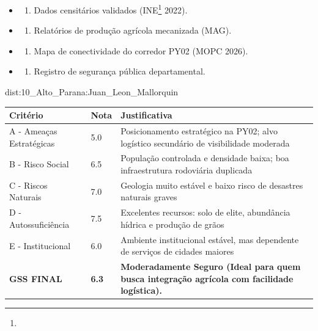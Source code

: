 {\begin{itemize}
\tightlist
\item
  \begin{enumerate}
  \def\labelenumi{\arabic{enumi})}
  \tightlist
  \item
    Dados censitários validados (INE\footnote{\fineINE} 2022).
  \end{enumerate}
\item
  \begin{enumerate}
  \def\labelenumi{\arabic{enumi})}
  \setcounter{enumi}{1}
  \tightlist
  \item
    Relatórios de produção agrícola mecanizada (MAG).
  \end{enumerate}
\item
  \begin{enumerate}
  \def\labelenumi{\arabic{enumi})}
  \setcounter{enumi}{2}
  \tightlist
  \item
    Mapa de conectividade do corredor PY02 (MOPC 2026).
  \end{enumerate}
\item
  \begin{enumerate}
  \def\labelenumi{\arabic{enumi})}
  \setcounter{enumi}{3}
  \tightlist
  \item
    Registro de segurança pública departamental.
  \end{enumerate}
\end{itemize}}{dist:10_Alto_Parana:Juan_Leon_Mallorquin}
\begin{table}[ht!]
\small \begin{tabular}{p{3.0cm}p{0.8cm}p{6.0cm}} \toprule
\textbf{Critério} & \textbf{Nota} & \textbf{Justificativa} \\ \midrule
A - Ameaças Estratégicas & 5.0 & Posicionamento estratégico na PY02; alvo logístico secundário de visibilidade moderada \\
B - Risco Social & 6.5 & População controlada e densidade baixa; boa infraestrutura rodoviária duplicada \\
C - Riscos Naturais & 7.0 & Geologia muito estável e baixo risco de desastres naturais graves \\
D - Autossuficiência & 7.5 & Excelentes recursos: solo de elite, abundância hídrica e produção de grãos \\
E - Institucional & 6.0 & Ambiente institucional estável, mas dependente de serviços de cidades maiores \\
\midrule \textbf{GSS FINAL} & \textbf{6.3} & \textbf{Moderadamente Seguro (Ideal para quem busca integração agrícola com facilidade logística).} \\ \bottomrule \end{tabular}
\end{table}
